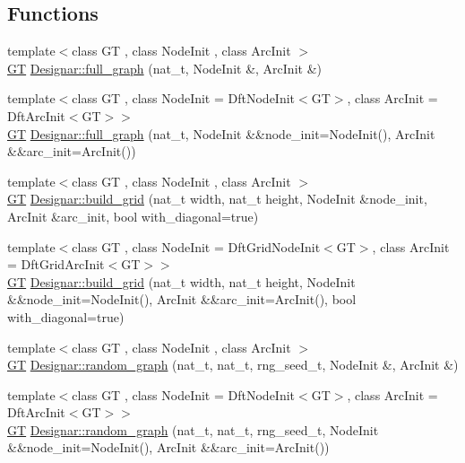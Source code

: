 \subsection*{Functions}
\begin{DoxyCompactItemize}
\item 
{\footnotesize template$<$class GT , class Node\+Init , class Arc\+Init $>$ }\\\hyperlink{demo-buildgraph_8_c_a3001c40d2c31ca87ed96cd7d1334a55e}{GT} \hyperlink{namespace_designar_a8d424cb12f90b415f71463d919979437}{Designar\+::full\+\_\+graph} (nat\+\_\+t, Node\+Init \&, Arc\+Init \&)
\item 
{\footnotesize template$<$class GT , class Node\+Init  = Dft\+Node\+Init$<$\+G\+T$>$, class Arc\+Init  = Dft\+Arc\+Init$<$\+G\+T$>$$>$ }\\\hyperlink{demo-buildgraph_8_c_a3001c40d2c31ca87ed96cd7d1334a55e}{GT} \hyperlink{namespace_designar_aa06a68f735d6f8086fe2c5f4cd8062f1}{Designar\+::full\+\_\+graph} (nat\+\_\+t, Node\+Init \&\&node\+\_\+init=Node\+Init(), Arc\+Init \&\&arc\+\_\+init=Arc\+Init())
\item 
{\footnotesize template$<$class GT , class Node\+Init , class Arc\+Init $>$ }\\\hyperlink{demo-buildgraph_8_c_a3001c40d2c31ca87ed96cd7d1334a55e}{GT} \hyperlink{namespace_designar_aec5eb60a497214494947086c4cd7af76}{Designar\+::build\+\_\+grid} (nat\+\_\+t width, nat\+\_\+t height, Node\+Init \&node\+\_\+init, Arc\+Init \&arc\+\_\+init, bool with\+\_\+diagonal=true)
\item 
{\footnotesize template$<$class GT , class Node\+Init  = Dft\+Grid\+Node\+Init$<$\+G\+T$>$, class Arc\+Init  = Dft\+Grid\+Arc\+Init$<$\+G\+T$>$$>$ }\\\hyperlink{demo-buildgraph_8_c_a3001c40d2c31ca87ed96cd7d1334a55e}{GT} \hyperlink{namespace_designar_a57d0b4318f5ae1ef0082a67d7eeb10fe}{Designar\+::build\+\_\+grid} (nat\+\_\+t width, nat\+\_\+t height, Node\+Init \&\&node\+\_\+init=Node\+Init(), Arc\+Init \&\&arc\+\_\+init=Arc\+Init(), bool with\+\_\+diagonal=true)
\item 
{\footnotesize template$<$class GT , class Node\+Init , class Arc\+Init $>$ }\\\hyperlink{demo-buildgraph_8_c_a3001c40d2c31ca87ed96cd7d1334a55e}{GT} \hyperlink{namespace_designar_aee2e3d201a649a468dbe1def58fd285a}{Designar\+::random\+\_\+graph} (nat\+\_\+t, nat\+\_\+t, rng\+\_\+seed\+\_\+t, Node\+Init \&, Arc\+Init \&)
\item 
{\footnotesize template$<$class GT , class Node\+Init  = Dft\+Node\+Init$<$\+G\+T$>$, class Arc\+Init  = Dft\+Arc\+Init$<$\+G\+T$>$$>$ }\\\hyperlink{demo-buildgraph_8_c_a3001c40d2c31ca87ed96cd7d1334a55e}{GT} \hyperlink{namespace_designar_ae9fce2578ac6b598baf1ecb7e38f77cf}{Designar\+::random\+\_\+graph} (nat\+\_\+t, nat\+\_\+t, rng\+\_\+seed\+\_\+t, Node\+Init \&\&node\+\_\+init=Node\+Init(), Arc\+Init \&\&arc\+\_\+init=Arc\+Init())

\end{DoxyCompactItemize}

